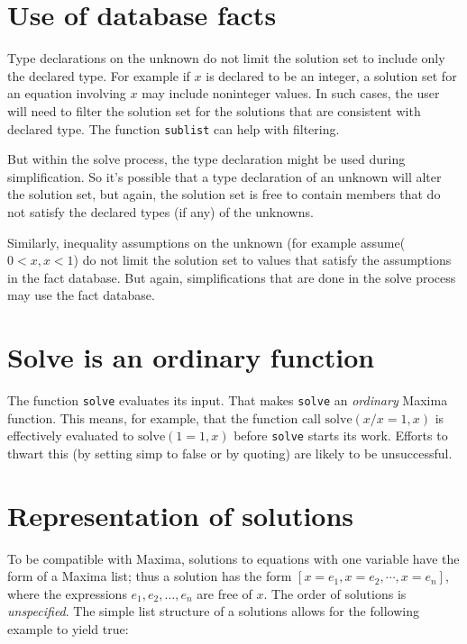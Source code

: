 \documentclass[]{scrartcl}
\newcommand{\solve}{\texttt{solve}}
\begin{document}
\section{Use of database facts}

Type declarations on the unknown do not limit the solution set to include only the declared type. For
example if \(x\) is declared to be an integer, a solution set for an equation involving \(x\) may include
noninteger values. In such cases, the user will need to filter the solution set for the solutions that are
consistent with declared type. The function \texttt{sublist} can help with filtering.

But within the solve process, the type declaration might be used during simplification. So it's possible
that a type declaration of an unknown will alter the solution set, but again, the solution set is free
to contain members that do not satisfy the declared types (if any) of the unknowns.

Similarly, inequality assumptions on the unknown (for example assume( \(0 < x, x < 1\)) do not limit the solution
set to values that satisfy the assumptions in the fact database. But again, simplifications that are done
in the solve process may use the fact database.

\section{Solve is an ordinary function}

The function \solve \/ evaluates its input. That makes \solve \/ an \emph{ordinary} Maxima function. This means,
for example, that the function call \(\mathrm{solve}(x/x=1,x)\) is effectively evaluated to
\(\mathrm{solve}(1=1,x)\) before \solve \/ starts its work. Efforts to thwart this (by setting simp to
false or by quoting) are likely to be unsuccessful.

\section{Representation of solutions}

To be compatible with Maxima, solutions to equations with one variable have the form of a Maxima list; thus a solution has the form \([x = e_1, x = e_2, \cdots, x = e_n]\), where the expressions \(e_1, e_2, \dots, e_n\) are free of \(x\). The order of solutions is \emph{unspecified}. The simple list structure of a solutions allows for the following example to yield true:
\end{document}
